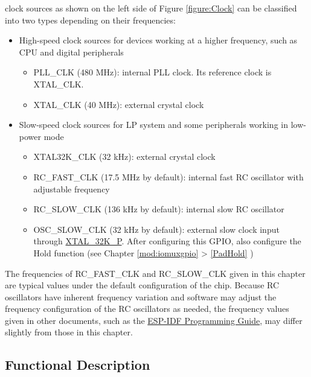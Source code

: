 \documentclass[main\_\_EN.tex]{subfiles}
\begin{document}
\chipname{} clock sources as shown on the left side of Figure \ref{figure:Clock} can be classified into two types depending on their frequencies:
\begin{itemize}
    \item High-speed clock sources for devices working at a higher frequency, such as CPU and digital peripherals
    \begin{itemize}
        \item PLL\_CLK (480 MHz): internal PLL clock. Its reference clock is XTAL\_CLK.
        \item XTAL\_CLK (40 MHz): external crystal clock
    \end{itemize}
    \item Slow-speed clock sources for LP system and some peripherals working in low-power mode
    \begin{itemize}
        \item XTAL32K\_CLK (32 kHz): external crystal clock
	    \item RC\_FAST\_CLK (17.5 MHz by default): internal fast RC oscillator with adjustable frequency
	    \item RC\_SLOW\_CLK (136 kHz by default): internal slow RC oscillator
	    \item OSC\_SLOW\_CLK (32 kHz by default): external slow clock input through \hyperref[table:rtcmux_analog_pads]{XTAL\_32K\_P}. After configuring this GPIO, also configure the Hold function (see Chapter \ref{mod:iomuxgpio} \textit{} >  \ref{PadHold} \textit{})
    \end{itemize}
\end{itemize}

\begin{tiplisting}
The frequencies of RC\_FAST\_CLK and RC\_SLOW\_CLK given in this chapter are typical values under the default configuration of the chip. Because RC oscillators have inherent frequency variation and software may adjust the frequency configuration of the RC oscillators as needed, the frequency values given in other documents, such as the \href{https://docs.espressif.com/projects/esp-idf/en/latest/esp32c6/api-reference/peripherals/clk_tree.html}{ESP-IDF Programming Guide}, may differ slightly from those in this chapter.
\end{tiplisting}

\subsection{Functional Description}
\end{document}
